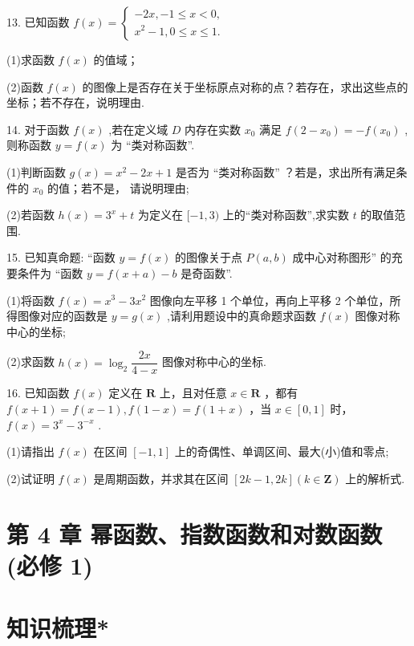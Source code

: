 13. 已知函数 $f\left( x\right)  = \left\{  \begin{array}{l}  - {2x}, - 1 \leq  x < 0, \\  {x}^{2} - 1,0 \leq  x \leq  1. \end{array}\right.$

(1)求函数 $f\left( x\right)$ 的值域；

(2)函数 $f\left( x\right)$ 的图像上是否存在关于坐标原点对称的点？若存在，求出这些点的坐标；若不存在，说明理由.

14. 对于函数 $f\left( x\right)$ ,若在定义域 $D$ 内存在实数 ${x}_{0}$ 满足 $f\left( {2 - {x}_{0}}\right)  =  - f\left( {x}_{0}\right)$ ,则称函数 $y = f\left( x\right)$ 为 “类对称函数”.

(1)判断函数 $g\left( x\right)  = {x}^{2} - {2x} + 1$ 是否为 “类对称函数” ？若是，求出所有满足条件的 ${x}_{0}$ 的值；若不是， 请说明理由;

(2)若函数 $h\left( x\right)  = {3}^{x} + t$ 为定义在 $\lbrack  - 1,3)$ 上的“类对称函数”,求实数 $t$ 的取值范围.

15. 已知真命题: “函数 $y = f\left( x\right)$ 的图像关于点 $P\left( {a,b}\right)$ 成中心对称图形” 的充要条件为 “函数 $y = f(x +  a) - b$ 是奇函数”.

(1)将函数 $f\left( x\right)  = {x}^{3} - 3{x}^{2}$ 图像向左平移 1 个单位，再向上平移 2 个单位，所得图像对应的函数是 $y =  g\left( x\right)$ ,请利用题设中的真命题求函数 $f\left( x\right)$ 图像对称中心的坐标;

(2)求函数 $h\left( x\right)  = {\log }_{2}\dfrac{2x}{4 - x}$ 图像对称中心的坐标.

16. 已知函数 $f\left( x\right)$ 定义在 $\mathbf{R}$ 上，且对任意 $x \in  \mathbf{R}$ ，都有 $f\left( {x + 1}\right)  = f\left( {x - 1}\right) ,f\left( {1 - x}\right)  = f\left( {1 + x}\right)$ ，当 $x \in  \left\lbrack  {0,1}\right\rbrack$ 时， $f\left( x\right)  = {3}^{x} - {3}^{-x}$ .

(1)请指出 $f\left( x\right)$ 在区间 $\left\lbrack  {-1,1}\right\rbrack$ 上的奇偶性、单调区间、最大(小)值和零点;

(2)试证明 $f\left( x\right)$ 是周期函数，并求其在区间 $\left\lbrack  {{2k} - 1,{2k}}\right\rbrack  \left( {k \in  \mathbf{Z}}\right)$ 上的解析式.

\section*{第 4 章 幂函数、指数函数和对数函数(必修 1)}

\section*{知识梳理*}

